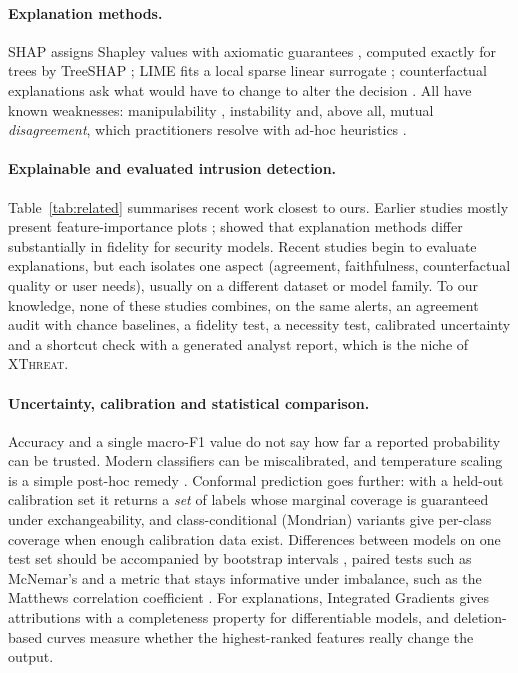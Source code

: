 \documentclass[11pt,a4paper]{article}
\newcommand{\XT}{\textsc{XThreat}}
\begin{document}
\paragraph{Explanation methods.} SHAP assigns Shapley values with axiomatic guarantees \parencite{lundberg2017}, computed exactly for trees by TreeSHAP \parencite{lundberg2020}; LIME fits a local sparse linear surrogate \parencite{ribeiro2016}; counterfactual explanations ask what would have to change to alter the decision \parencite{wachter2018,mothilal2020}. All have known weaknesses: manipulability \parencite{slack2020}, instability \parencite{alvarezmelis2018} and, above all, mutual \emph{disagreement}, which practitioners resolve with ad-hoc heuristics \parencite{krishna2024}.

\paragraph{Explainable and evaluated intrusion detection.} Table~\ref{tab:related} summarises recent work closest to ours. Earlier studies mostly present feature-importance plots \parencite{marino2018,wang2020,mane2021,neupane2022}; \textcite{warnecke2020} showed that explanation methods differ substantially in fidelity for security models. Recent studies begin to evaluate explanations, but each isolates one aspect (agreement, faithfulness, counterfactual quality or user needs), usually on a different dataset or model family. To our knowledge, none of these studies combines, on the same alerts, an agreement audit with chance baselines, a fidelity test, a necessity test, calibrated uncertainty and a shortcut check with a generated analyst report, which is the niche of \XT.

\paragraph{Uncertainty, calibration and statistical comparison.} Accuracy and a single macro-F1 value do not say how far a reported probability can be trusted. Modern classifiers can be miscalibrated, and temperature scaling is a simple post-hoc remedy \parencite{guo2017}. Conformal prediction \parencite{vovk2005,angelopoulos2023} goes further: with a held-out calibration set it returns a \emph{set} of labels whose marginal coverage is guaranteed under exchangeability, and class-conditional (Mondrian) variants give per-class coverage when enough calibration data exist. Differences between models on one test set should be accompanied by bootstrap intervals \parencite{efron1993}, paired tests such as McNemar's \parencite{mcnemar1947} and a metric that stays informative under imbalance, such as the Matthews correlation coefficient \parencite{matthews1975}. For explanations, Integrated Gradients \parencite{sundararajan2017} gives attributions with a completeness property for differentiable models, and deletion-based curves \parencite{samek2017} measure whether the highest-ranked features really change the output.
\end{document}
